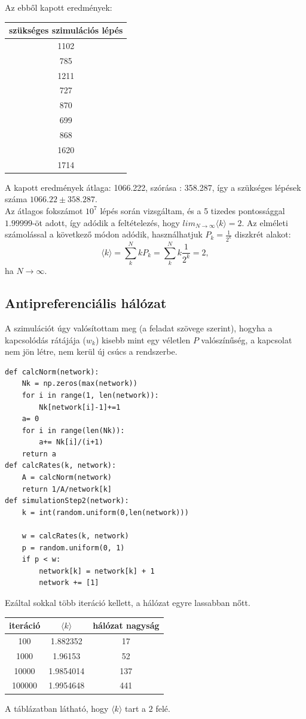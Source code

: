 \documentclass[12pt]{article}
\begin{document}
 Az ebből kapott eredmények:
 \begin{center}
\begin{tabular}{|c|}\hline
szükséges szimulációs lépés\\ \hline
1102 \\ \hline
785 \\ \hline
1211 \\ \hline
727 \\ \hline
870\\ \hline
699 \\ \hline
868 \\ \hline
1620 \\ \hline
1714\\ \hline
\end{tabular}
\end{center} 
A kapott eredmények átlaga: 1066.222, szórása : 358.287, így a szükséges lépések száma $1066.22\pm 358.287$. \\
Az átlagos fokszámot $10^7$ lépés során vizsgáltam, és a 5 tizedes pontossággal $1.99999$-öt adott, így adódik a feltételezés, hogy $lim_{N\to\infty}\langle k\rangle = 2$. Az elméleti számolással a következő módon adódik, használhatjuk $P_k = \frac{1}{2^k}$ diszkrét alakot:
$$\langle k\rangle = \sum^N_kkP_k = \sum^N_k k\frac{1}{2^k} = 2,$$
ha $N\to \infty$.
\newpage
\subsection*{Antipreferenciális hálózat}
A szimulációt úgy valósítottam meg (a feladat szövege szerint), hogyha a kapcsolódás rátájája ($w_k$) kisebb mint egy véletlen $P$ valószínűség, a kapcsolat nem jön létre, nem kerül új csúcs a rendszerbe.
\begin{lstlisting}
def calcNorm(network):
    Nk = np.zeros(max(network))
    for i in range(1, len(network)):
        Nk[network[i]-1]+=1
    a= 0
    for i in range(len(Nk)):
        a+= Nk[i]/(i+1)
    return a    
def calcRates(k, network):
    A = calcNorm(network)
    return 1/A/network[k]
def simulationStep2(network):
    k = int(random.uniform(0,len(network)))
    
    w = calcRates(k, network)
    p = random.uniform(0, 1)
    if p < w:
        network[k] = network[k] + 1
        network += [1]
\end{lstlisting}
Ezáltal sokkal több iteráció kellett, a hálózat egyre lassabban nőtt.
\begin{center}
\begin{tabular}{|c|c|c|}\hline
iteráció&$\langle k\rangle$ & hálózat nagyság \\ \hline
100&1.882352 & 17\\ \hline
1000&1.96153 & 52\\ \hline
10000&1.9854014 &137\\ \hline
100000&1.9954648& 441 \\ \hline
\end{tabular}
\end{center}
A táblázatban látható, hogy $\langle k\rangle$ tart a $2$ felé.
\end{document}
